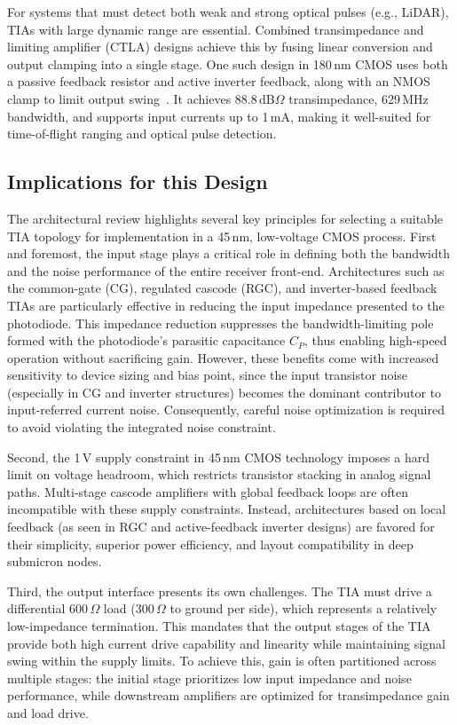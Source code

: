 \documentclass[11pt]{article}
\begin{document}
For systems that must detect both weak and strong optical pulses (e.g., LiDAR), TIAs with large dynamic range are essential. Combined transimpedance and limiting amplifier (CTLA) designs achieve this by fusing linear conversion and output clamping into a single stage. One such design in 180\,nm CMOS uses both a passive feedback resistor and active inverter feedback, along with an NMOS clamp to limit output swing~\cite{ctla_mdpi}. It achieves 88.8\,dB$\Omega$ transimpedance, 629\,MHz bandwidth, and supports input currents up to 1\,mA, making it well-suited for time-of-flight ranging and optical pulse detection.

\subsection{Implications for this Design}

The architectural review highlights several key principles for selecting a suitable TIA topology for implementation in a 45\,nm, low-voltage CMOS process. First and foremost, the input stage plays a critical role in defining both the bandwidth and the noise performance of the entire receiver front-end. Architectures such as the common-gate (CG), regulated cascode (RGC), and inverter-based feedback TIAs are particularly effective in reducing the input impedance presented to the photodiode. This impedance reduction suppresses the bandwidth-limiting pole formed with the photodiode's parasitic capacitance $C_P$, thus enabling high-speed operation without sacrificing gain. However, these benefits come with increased sensitivity to device sizing and bias point, since the input transistor noise (especially in CG and inverter structures) becomes the dominant contributor to input-referred current noise. Consequently, careful noise optimization is required to avoid violating the integrated noise constraint.

Second, the 1\,V supply constraint in 45\,nm CMOS technology imposes a hard limit on voltage headroom, which restricts transistor stacking in analog signal paths. Multi-stage cascode amplifiers with global feedback loops are often incompatible with these supply constraints. Instead, architectures based on local feedback (as seen in RGC and active-feedback inverter designs) are favored for their simplicity, superior power efficiency, and layout compatibility in deep submicron nodes.

Third, the output interface presents its own challenges. The TIA must drive a differential 600\,$\Omega$ load (300\,$\Omega$ to ground per side), which represents a relatively low-impedance termination. This mandates that the output stages of the TIA provide both high current drive capability and linearity while maintaining signal swing within the supply limits. To achieve this, gain is often partitioned across multiple stages: the initial stage prioritizes low input impedance and noise performance, while downstream amplifiers are optimized for transimpedance gain and load drive.
\end{document}

